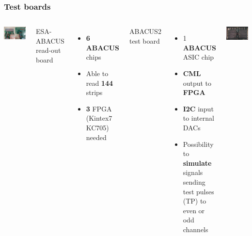 \documentclass[aspectratio=169]{beamer}
\begin{document}
	\begin{frame}
	\frametitle{Test boards}
		\begin{columns}
			\begin{center}
				\includegraphics[width=0.99 \textwidth]{IMG/TestBoard.pdf}
			\end{center}
		{\hspace*{1.5cm}
		{\color{blue}ESA-ABACUS read-out board}
		\begin{itemize}
			\item \textbf{6 ABACUS} chips
			\item Able to read \textbf{144} strips
			\item \textbf{3} FPGA (Kintex7 KC705) needed
		\end{itemize}
			}
			\vspace*{1cm}
			\hspace*{1.5cm}
			{\color{blue}ABACUS2 test board}
			\begin{itemize}
				\item 1 \textbf{ABACUS} ASIC chip
				\item \textbf{CML} output to \textbf{FPGA}
				\item \textbf{I2C} input to internal DACs
				\item Possibility to \textbf{simulate} signals sending test pulses (TP) to even or odd channels
			\end{itemize}
		\begin{center}
			\vspace*{0.5cm}
			\includegraphics[width=0.6 \textwidth]{IMG/EsaAbacus.png}
		\end{center}
	
		\end{columns}	
	\end{frame}
\end{document}

